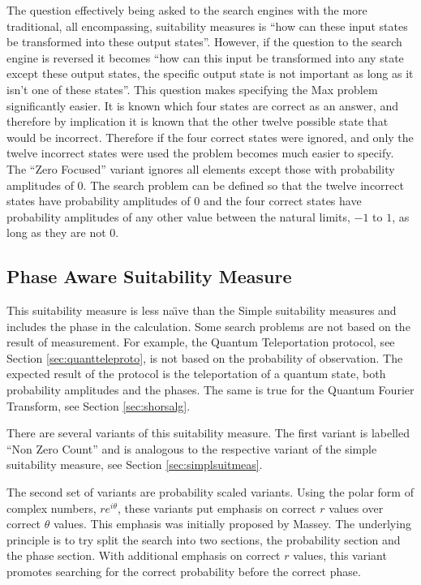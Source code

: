 The question effectively being asked to the search engines with the more traditional, all encompassing, suitability measures is ``how can these input states be transformed into these output states''.
However, if the question to the search engine is reversed it becomes ``how can this input be transformed into any state except these output states, the specific output state is not important as long as it isn't one of these states''.
This question makes specifying the Max problem significantly easier.
It is known which four states are correct as an answer, and therefore by implication it is known that the other twelve possible state that would be incorrect.
Therefore if the four correct states were ignored, and only the twelve incorrect states were used the problem becomes much easier to specify.
The ``Zero Focused'' variant ignores all elements except those with probability amplitudes of $0$.
The search problem can be defined so that the twelve incorrect states have probability amplitudes of $0$ and the four correct states have probability amplitudes of any other value between the natural limits, $-1$ to $1$, as long as they are not $0$.

\subsection{Phase Aware Suitability Measure}
\label{sec:phaseawaresuitmeas}
This suitability measure is less na\"{\i}ve than the Simple suitability measures and includes the phase in the calculation.
Some search problems are not based on the result of measurement.
For example, the Quantum Teleportation protocol, see Section \ref{sec:quantteleproto}, is not based on the probability of observation.
The expected result of the protocol is the teleportation of a quantum state, both probability amplitudes and the phases.
The same is true for the Quantum Fourier Transform, see Section \ref{sec:shorsalg}.

There are several variants of this suitability measure.
The first variant is labelled ``Non Zero Count'' and is analogous to the respective variant of the simple suitability measure, see Section \ref{sec:simplsuitmeas}.

The second set of variants are probability scaled variants.
Using the polar form of complex numbers, $re^{i\theta}$, these variants put emphasis on correct $r$ values over correct $\theta$ values.
This emphasis was initially proposed by Massey\cite{masseythesis}.
The underlying principle is to try split the search into two sections, the probability section and the phase section.
With additional emphasis on correct $r$ values, this variant promotes searching for the correct probability before the correct phase.

